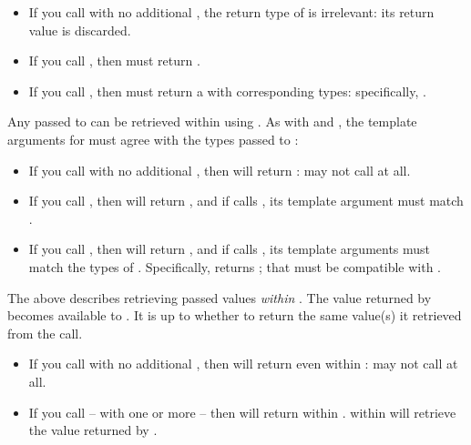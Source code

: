 \begin{itemize}
  \item If you call  with no additional ,
  the return type of  is irrelevant: its return value is discarded.
  \item If you call , then 
  must return .
  \item If you call ,
  then  must return a  with corresponding types:
  specifically, .
\end{itemize}

Any  passed to \resumewith can be retrieved within 
using \getdata. As with \callcc and \resume, the template arguments
for \getdata must agree with the types passed to \resumewith:

\begin{itemize}
  \item If you call  with no additional ,
  then \dataavail will return :  may not call \getdata at
  all.
  \item If you call , then \dataavail
  will return , and if  calls \getdata, its template
  argument must match .
  \item If you call ,
  then \dataavail will return , and if  calls \getdata,
  its template arguments must match the types of .
  Specifically,  returns ;
  that  must be compatible
  with .
\end{itemize}

The above describes retrieving passed values \emph{within} . The
value returned by  becomes available to .
It is up to  whether to return the same value(s) it retrieved from
the \resumewith call.

\begin{itemize}
  \item If you call  with no additional ,
  then \dataavail will return  even
  within :  may not call \getdata at all.
  \item If you call  -- with one or
  more  -- then \dataavail will return 
  within . \getdata within  will retrieve
  the value returned by .
\end{itemize}

